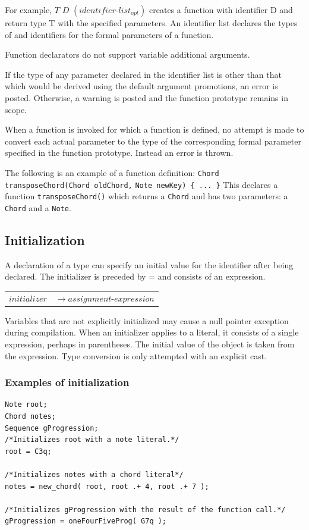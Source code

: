 \documentclass[12pt,A4]{book}
\begin{document}
For example,
$T$ $D$ $(identifier\mbox{-}list_{opt})$
creates a function with identifier D and return type T with the specified parameters. An identifier list declares the types of and identifiers for the formal parameters of a function.

Function declarators do not support variable additional arguments.  

If the type of any parameter declared in the identifier list is other than that which would be derived using the default argument promotions, an error is posted.  Otherwise, a warning is posted and the function prototype remains in scope.

When a function is invoked for which a function is defined, no attempt is made to convert each actual parameter to the type of the corresponding formal parameter specified in the function prototype. Instead an error is thrown.  

The following is an example of a function definition:
\verb|Chord transposeChord(Chord oldChord,| \verb|Note newKey) { ... }|
This declares a function \verb|transposeChord()| which returns a \verb|Chord| and has two parameters: a \verb|Chord| and a \verb|Note|.  
\subsection{Initialization}
A declaration of a type can specify an initial value for the identifier after being declared.  The initializer is preceded by = and consists of an expression.

\begin{tabular}{l l}
$initializer$ & $\rightarrow assignment\mbox{-}expression$\\
\end{tabular}

Variables that are not explicitly initialized may cause a null pointer exception during compilation. When an initializer applies to a literal, it consists of a single expression, perhaps in parentheses.  The initial value of the object is taken from the expression.  Type conversion is only attempted with an explicit cast.

\subsubsection{Examples of initialization}
\begin{verbatim}
Note root;
Chord notes;
Sequence gProgression;
/*Initializes root with a note literal.*/
root = C3q;

/*Initializes notes with a chord literal*/
notes = new_chord( root, root .+ 4, root .+ 7 );

/*Initializes gProgression with the result of the function call.*/
gProgression = oneFourFiveProg( G7q );
\end{verbatim}
\end{document}
